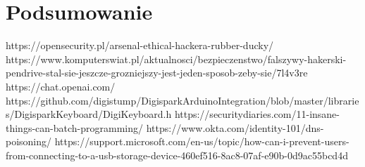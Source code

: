 \documentclass{article}
\begin{document}
\section{Podsumowanie}
      

\begin{thebibliography}{9}

\bibitem{}
  https://opensecurity.pl/arsenal-ethical-hackera-rubber-ducky/
 \bibitem{} https://www.komputerswiat.pl/aktualnosci/bezpieczenstwo/falszywy-hakerski-pendrive-stal-sie-jeszcze-grozniejszy-jest-jeden-sposob-zeby-sie/7l4v3re
 \bibitem{} https://chat.openai.com/
 \bibitem{} https://github.com/digistump/DigisparkArduinoIntegration/blob/master/libraries/DigisparkKeyboard/DigiKeyboard.h
 \bibitem{} https://securitydiaries.com/11-insane-things-can-batch-programming/
 \bibitem{} https://www.okta.com/identity-101/dns-poisoning/
 \bibitem{} https://support.microsoft.com/en-us/topic/how-can-i-prevent-users-from-connecting-to-a-usb-storage-device-460ef516-8ac8-07af-e90b-0d9ac55bcd4d
\end{thebibliography}
\end{document}
